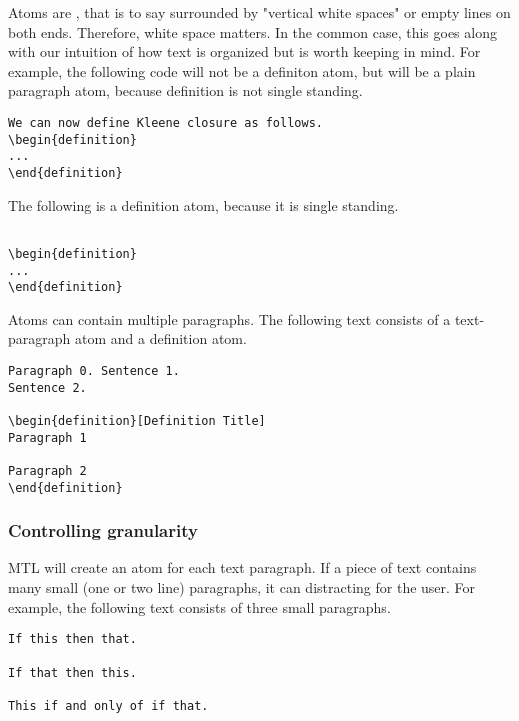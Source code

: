 \begin{important}
Atoms are , that is to say surrounded by "vertical
white spaces" or empty lines on both ends.
%
Therefore,  white space  matters. In the common case, this goes along with our intuition of how text is organized but is worth keeping in mind. For example, the following code will not be a definiton atom, but will be a plain paragraph atom, because definition is not single standing.

\begin{lstlisting}
We can now define Kleene closure as follows.
\begin{definition}
...
\end{definition}
\end{lstlisting}

The following is a definition atom, because it is single standing.
\begin{lstlisting}

\begin{definition}
...
\end{definition}

\end{lstlisting}
\end{important}

\begin{note}
Atoms can contain multiple paragraphs.  The following text consists of a text-paragraph atom and a definition atom.


\begin{lstlisting}
Paragraph 0. Sentence 1.
Sentence 2.

\begin{definition}[Definition Title]
Paragraph 1

Paragraph 2
\end{definition}
\end{lstlisting}
\end{note}

\subsubsection{Controlling granularity}

MTL will create an atom for each text paragraph.  If a piece of text contains many small (one or two line) paragraphs, it can distracting for the user.  For example, the following text consists of three small paragraphs.
%
\begin{lstlisting}
If this then that.

If that then this.

This if and only of if that.
\end{lstlisting}

